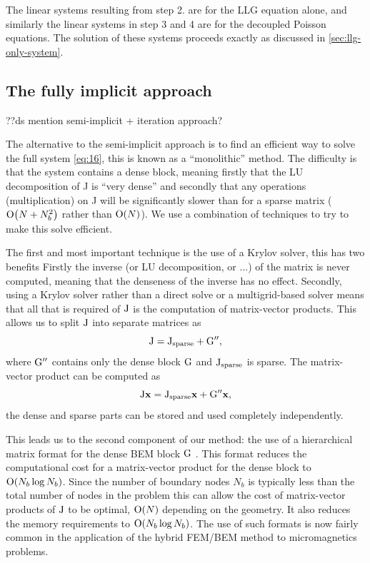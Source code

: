 The linear systems resulting from step 2. are for the LLG equation alone, and similarly the linear systems in step 3 and 4 are for the decoupled Poisson equations.
The solution of these systems proceeds exactly as discussed in \cref{sec:llg-only-system}.




\subsection{The fully implicit approach}
\label{sec:fully-implicit-bem}

??ds mention semi-implicit + iteration approach?

The alternative to the semi-implicit approach is to find an efficient way to solve the full system \cref{eq:16}, this is known as a ``monolithic'' method.
The difficulty is that the system contains a dense block, meaning firstly that the LU decomposition of J is ``very dense'' and secondly that any operations (\eg multiplication) on J will be significantly slower than for a sparse matrix ($\mathrm{O}{\left( N+ N_b^2 \right)}$ rather than $\mathrm{O}{\left( N \right)}$).
We use a combination of techniques to try to make this solve efficient.

The first and most important technique is the use of a Krylov solver, this has two benefits
Firstly the inverse (or LU decomposition, or ...) of the matrix is never computed, meaning that the denseness of the inverse has no effect.
Secondly, using a Krylov solver rather than a direct solve or a multigrid-based solver means that all that is required of $\mathrm{J}$ is the computation of matrix-vector products.
This allows us to split $\mathrm{J}$ into separate matrices as
\begin{equation}
  \mathrm{J} = \mathrm{J}_{\textrm{sparse}} + \mathrm{G}'',
\end{equation}
where $\mathrm{G}''$ contains only the dense block $\mathrm{G}$ and $\mathrm{J}_{\textrm{sparse}}$ is sparse.
The matrix-vector product can be computed as
\begin{equation}
  \mathrm{J} \boldsymbol{\mathrm{x}} = \mathrm{J}_{\textrm{sparse}}\boldsymbol{\mathrm{x}} + \mathrm{G}''\boldsymbol{\mathrm{x}},
\end{equation}
\ie the dense and sparse parts can be stored and used completely independently.

This leads us to the second component of our method: the use of a hierarchical matrix format for the dense BEM block $\mathrm{G}$ \cite{Borm2003,Forster2003,Knittel2011}.
This format reduces the computational cost for a matrix-vector product for the dense block to $\mathrm{O}{\left( N_b \log N_b \right)}$.
Since the number of boundary nodes $N_b$ is typically less than the total number of nodes in the problem this can allow the cost of matrix-vector products of $\mathrm{J}$ to be optimal, \ie $\mathrm{O}{\left( N \right)}$ depending on the geometry.
It also reduces the memory requirements to $\mathrm{O}{\left( N_b \log N_b \right)}$.
The use of such formats is now fairly common in the application of the hybrid FEM/BEM method to micromagnetics problems.

